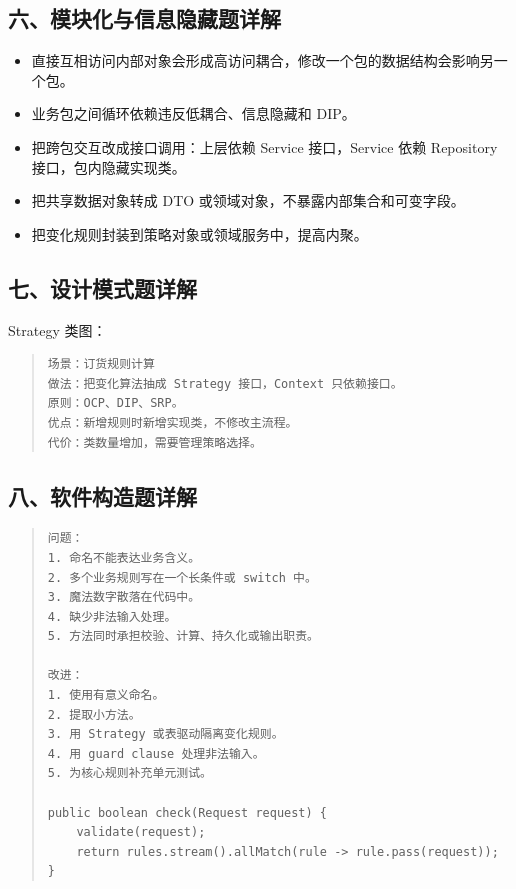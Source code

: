 \documentclass[UTF8,zihao=-4]{ctexart}
\begin{document}
\subsection{六、模块化与信息隐藏题详解}


\begin{itemize}
\item 直接互相访问内部对象会形成高访问耦合，修改一个包的数据结构会影响另一个包。
\item 业务包之间循环依赖违反低耦合、信息隐藏和 DIP。
\item 把跨包交互改成接口调用：上层依赖 Service 接口，Service 依赖 Repository 接口，包内隐藏实现类。
\item 把共享数据对象转成 DTO 或领域对象，不暴露内部集合和可变字段。
\item 把变化规则封装到策略对象或领域服务中，提高内聚。
\end{itemize}



\subsection{七、设计模式题详解}


Strategy 类图：


\begin{quote}
\footnotesize
\begin{verbatim}
场景：订货规则计算
做法：把变化算法抽成 Strategy 接口，Context 只依赖接口。
原则：OCP、DIP、SRP。
优点：新增规则时新增实现类，不修改主流程。
代价：类数量增加，需要管理策略选择。
\end{verbatim}
\end{quote}



\subsection{八、软件构造题详解}


\begin{quote}
\footnotesize
\begin{verbatim}
问题：
1. 命名不能表达业务含义。
2. 多个业务规则写在一个长条件或 switch 中。
3. 魔法数字散落在代码中。
4. 缺少非法输入处理。
5. 方法同时承担校验、计算、持久化或输出职责。

改进：
1. 使用有意义命名。
2. 提取小方法。
3. 用 Strategy 或表驱动隔离变化规则。
4. 用 guard clause 处理非法输入。
5. 为核心规则补充单元测试。

public boolean check(Request request) {
    validate(request);
    return rules.stream().allMatch(rule -> rule.pass(request));
}
\end{verbatim}
\end{quote}
\end{document}
